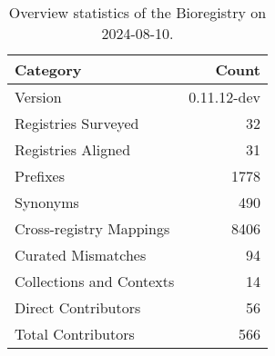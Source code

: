 \begin{table}
\caption{Overview statistics of the Bioregistry on 2024-08-10.}
\label{tab:bioregistry-summary}
\begin{tabular}{lr}
\toprule
Category & Count \\
\midrule
Version & 0.11.12-dev \\
Registries Surveyed & 32 \\
Registries Aligned & 31 \\
Prefixes & 1778 \\
Synonyms & 490 \\
Cross-registry Mappings & 8406 \\
Curated Mismatches & 94 \\
Collections and Contexts & 14 \\
Direct Contributors & 56 \\
Total Contributors & 566 \\
\bottomrule
\end{tabular}
\end{table}
